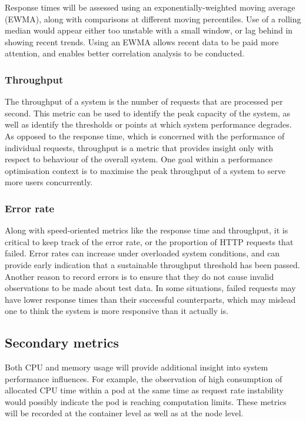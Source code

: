 Response times will be assessed using an exponentially-weighted moving average (EWMA), along with comparisons at different moving percentiles. Use of a rolling median would appear either too unstable with a small window, or lag behind in showing recent trends. Using an EWMA allows recent data to be paid more attention, and enables better correlation analysis to be conducted.

\subsubsection{Throughput}

The throughput of a system is the number of requests that are processed per second. This metric can be used to identify the peak capacity of the system, as well as identify the thresholds or points at which system performance degrades. As opposed to the response time, which is concerned with the performance of individual requests, throughput is a metric that provides insight only with respect to behaviour of the overall system. One goal within a performance optimisation context is to maximise the peak throughput of a system to serve more users concurrently.

\subsubsection{Error rate}

Along with speed-oriented metrics like the response time and throughput, it is critical to keep track of the error rate, or the proportion of HTTP requests that failed. Error rates can increase under overloaded system conditions, and can provide early indication that a sustainable throughput threshold has been passed. Another reason to record errors is to ensure that they do not cause invalid observations to be made about test data. In some situations, failed requests may have lower response times than their successful counterparts, which may mislead one to think the system is more responsive than it actually is.

\subsection{Secondary metrics}

Both CPU and memory usage will provide additional insight into system performance influences. For example, the observation of high consumption of allocated CPU time within a pod at the same time as request rate instability would possibly indicate the pod is reaching computation limits. These metrics will be recorded at the container level as well as at the node level. 

